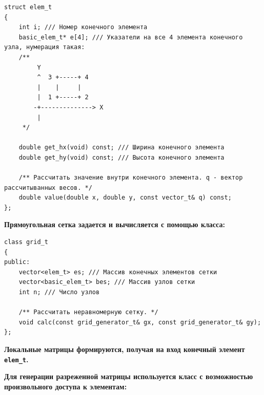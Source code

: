 \begin{tcolorbox}[
	colback=white,
	colframe=black!30!white,
	boxrule=0.5pt, 
	listing only,
	left=-0.5mm,
	leftrule=4mm,
	arc=2mm, outer arc=2mm,
	top=0pt,
	bottom=0pt,
	enhanced jigsaw,
	coltitle=black, 
	fonttitle=\bfseries\ttfamily,
	break at=-\baselineskip/0pt/\textheight, 
]
\begin{verbatim}
struct elem_t
{
	int i; /// Номер конечного элемента
	basic_elem_t* e[4]; /// Указатели на все 4 элемента конечного узла, нумерация такая:
	/** 
		 Y
		 ^  3 +-----+ 4
		 |    |     |
		 |  1 +-----+ 2
		-+--------------> X
		 |
	 */

	double get_hx(void) const; /// Ширина конечного элемента
	double get_hy(void) const; /// Высота конечного элемента

	/** Рассчитать значение внутри конечного элемента. q - вектор рассчитыванных весов. */
	double value(double x, double y, const vector_t& q) const;
};
\end{verbatim}
\end{tcolorbox} 

\noindent\textbf{Прямоугольная сетка задается и вычисляется с помощью класса:}

\begin{tcolorbox}[
	colback=white,
	colframe=black!30!white,
	boxrule=0.5pt, 
	listing only,
	left=-0.5mm,
	leftrule=4mm,
	arc=2mm, outer arc=2mm,
	top=0pt,
	bottom=0pt,
	enhanced jigsaw,
	coltitle=black, 
	fonttitle=\bfseries\ttfamily,
	break at=-\baselineskip/0pt/\textheight, 
]
\begin{verbatim}
class grid_t
{
public:
	vector<elem_t> es; /// Массив конечных элементов сетки
	vector<basic_elem_t> bes; /// Массив узлов сетки
	int n; /// Число узлов

	/** Рассчитать неравномерную сетку. */
	void calc(const grid_generator_t& gx, const grid_generator_t& gy);
};
\end{verbatim}
\end{tcolorbox} 

\noindent\textbf{Локальные матрицы формируются, получая на вход конечный элемент \texttt{elem\_t}.}

\noindent\textbf{Для генерации разреженной матрицы используется класс с возможностью произвольного доступа к элементам:}

